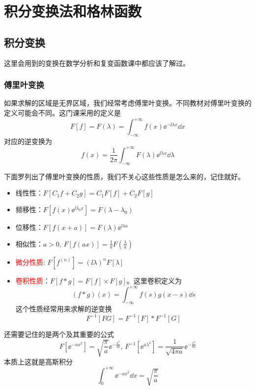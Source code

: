 \chapter{积分变换法和格林函数}
\section{积分变换}
这里会用到的变换在数学分析和复变函数课中都应该了解过。
\subsection{傅里叶变换}
如果求解的区域是无界区域，我们经常考虑傅里叶变换。不同教材对傅里叶变换的定义可能会不同。这门课采用的定义是
\[F[f] = F(\lambda) = \int_{-\infty}^{+\infty} f(x) \ee^{-\ii\lambda x} \dd{x}\]
对应的逆变换为
\[f(x) = \frac{1}{2 \pi} \int_{-\infty}^{+\infty} F(\lambda) \ee^{\ii \lambda x} \dd{\lambda}\]

下面罗列出了傅里叶变换的性质，我们不关心这些性质是怎么来的，记住就好。
\begin{itemize}
    \item 线性性：$F[C_1 f + C_2 g] = C_1 F[f] + C_2 F[g]$
    \item 频移性：$F[f(x) \ee^{\ii \lambda_0 x}] = F(\lambda - \lambda_0)$
    \item 位移性：$F[f(x + a)] = F(\lambda) \ee^{\ii \lambda a}$
    \item 相似性：$a > 0, \, F[f(ax)] = \frac{1}{a} F(\frac{\lambda}{a})$
    \item \textcolor{red}{微分性质}: $F[f^{(n)}] = (\ii \lambda)^n F[\lambda]$
    \item \textcolor{red}{卷积性质}：$F[f * g] = F[f] \times F[g]$。这里卷积定义为
        \[(f * g)(x) = \int_{-\infty}^{+\infty} f(s) g(x - s) \dd{s}\]
        这个性质经常用来求解的逆变换
        \[F^{-1}[F G] = F^{-1}[F] * F^{-1}[G]\]
\end{itemize}

还需要记住的是两个及其重要的公式
\color{red}
\[F[\ee^{- a x^2}] = \sqrt{\frac{\pi}{a}} \ee^{-\frac{\lambda^2}{4a}},\, F^{-1}[\ee^{a \lambda^2}] = \frac{1}{\sqrt{4 \pi a}} \ee^{-\frac{x^2}{4a}}\]
\color{black}
本质上这就是高斯积分
\[\int_{0}^{+\infty} \ee^{-a x^2} \dd{x} = \sqrt{\frac{\pi}{a}}\]

